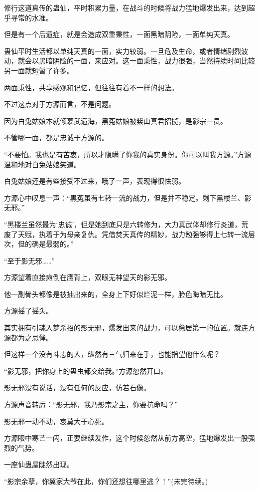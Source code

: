 \begin{this_body}
修行这道真传的蛊仙，平时积累力量，在战斗的时候将战力猛地爆发出来，达到超乎寻常的水准。

但是有一个后遗症，就是会造成双重秉性，一面黑暗阴险，一面单纯天真。

蛊仙平时生活都以单纯天真的一面，实力较弱。一旦危及生命，或者情绪剧烈波动，就会以黑暗阴险的一面，来应对。这一面秉性，战力很强，当然持续时间比较另一面就短暂了许多。

两面秉性，共享感观和记忆，但往往有着不一样的想法。

不过这点对于方源而言，不是问题。

因为白兔姑娘本就倾慕武遗海，黑菟姑娘被紫山真君招揽，是影宗一员。

不管哪一面，都是忠诚于方源的。

“不要怕。我也是有苦衷，所以才隐瞒了你我的真实身份。你可以叫我方源。”方源温和地对白兔姑娘笑道。

白兔姑娘还是有些接受不过来，哦了一声，表现得很怯弱。

方源心中叹息一声：“黑菟虽有七转一流的战力，但是并不稳定。剩下黑楼兰、影无邪。”

“黑楼兰虽然最为‘忠诚’，但是她到底只是六转修为，大力真武体却修行炎道，荒废了天赋，执着于为母亲复仇。凭借焚天真传的精妙，战力勉强够得上七转一流层次，但的确是最弱的。”

“至于影无邪……”

方源望着直接瘫倒在鹰背上，双眼无神望天的影无邪。

他一副骨头都像是被抽出来的，全身上下好似烂泥一样，脸色晦暗无比。

方源摇了摇头。

其实拥有引魂入梦杀招的影无邪，爆发出来的战力，可以稳居第一的位置。就连方源都为之忌惮。

但这样一个没有斗志的人，纵然有三气归来在手，也能指望他什么呢？

“影无邪，把你身上的蛊虫都交给我。”方源忽然开口。

影无邪没有说话，没有任何的反应，仿若石像。

方源声音转厉：“影无邪，我乃影宗之主，你要抗命吗？”

影无邪一动不动，哀莫大于心死。

方源眼中寒芒一闪，正要继续发作，这个时候忽然从前方高空，猛地爆发出一股强烈的气势。

一座仙蛊屋陡然出现。

“影宗余孽，你翼家大爷在此，你们还想往哪里逃？！”(未完待续。)

\end{this_body}

